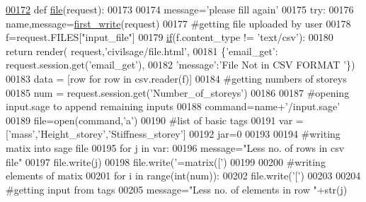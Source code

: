 \begin{DoxyCode}
\hypertarget{namespacecivilsage_1_1views_l00172}{}\hyperlink{namespacecivilsage_1_1views_a32de127956738677913352a2db84ecdb}{00172} \textcolor{keyword}{def }\hyperlink{namespacecivilsage_1_1views_a32de127956738677913352a2db84ecdb}{file}(request):
00173 
00174     message=\textcolor{stringliteral}{'please fill again'}
00175     \textcolor{keywordflow}{try}:
00176         name,message=\hyperlink{namespacecivilsage_1_1views_ad9397359f36a9df37e0aa43f3be032a3}{first\_write}(request)
00177         \textcolor{comment}{#getting file uploaded by user}
00178         f=request.FILES[\textcolor{stringliteral}{"input\_file"}]
00179         \hyperlink{bootstrap_8min_8js_ac2d69f5011896c6ed4a54e0dd36f6334}{if}(f.content\_type != \textcolor{stringliteral}{'text/csv'}):
00180             \textcolor{keywordflow}{return} render( request,\textcolor{stringliteral}{'civilsage/file.html'},
00181             \{\textcolor{stringliteral}{'email\_get'}: request.session.get(\textcolor{stringliteral}{'email\_get'}),
00182             \textcolor{stringliteral}{'message'}:\textcolor{stringliteral}{'File Not in CSV FORMAT '}\})
00183         data = [row \textcolor{keywordflow}{for} row \textcolor{keywordflow}{in} csv.reader(f)]
00184         \textcolor{comment}{#getting numbers of storeys}
00185         num = request.session.get(\textcolor{stringliteral}{'Number\_of\_storeys'})
00186 
00187         \textcolor{comment}{#opening input.sage to append remaining inputs}
00188         command=name+\textcolor{stringliteral}{'/input.sage'}
00189         file=open(command,\textcolor{stringliteral}{'a'})
00190         \textcolor{comment}{#list of basic tags}
00191         var = [\textcolor{stringliteral}{'mass'},\textcolor{stringliteral}{'Height\_storey'},\textcolor{stringliteral}{'Stiffness\_storey'}]
00192         jar=0
00193 
00194         \textcolor{comment}{#writing matix into sage file}
00195         \textcolor{keywordflow}{for} j \textcolor{keywordflow}{in} var:
00196             message=\textcolor{stringliteral}{"Less no. of rows in csv file"}
00197             file.write(j)
00198             file.write(\textcolor{stringliteral}{'=matrix(['})
00199 
00200             \textcolor{comment}{#writing elements of matix}
00201             \textcolor{keywordflow}{for} i \textcolor{keywordflow}{in} range(int(num)):
00202                 file.write(\textcolor{stringliteral}{'['})
00203 
00204                 \textcolor{comment}{#getting input from tags}
00205                 message=\textcolor{stringliteral}{"Less no. of elements in row "}+str(j)

\end{DoxyCode}
